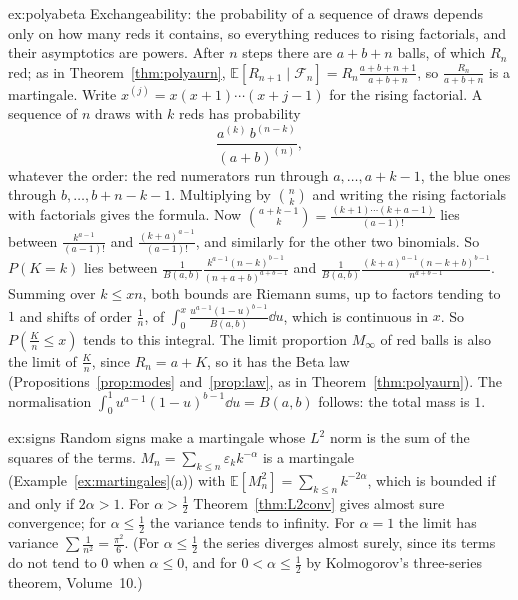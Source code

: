 \begin{solution}{ex:polyabeta}
\idea Exchangeability: the probability of a sequence of draws depends only on how many reds it contains, so everything
reduces to rising factorials, and their asymptotics are powers.
\writeup After $n$ steps there are $a+b+n$ balls, of which $R_n$ red; as in Theorem~\ref{thm:polyaurn}, $\mathbb E[R_{n+1}\mid\mathcal F_n]=R_n\frac{a+b+n+1}{a+b+n}$, so $\frac{R_n}{a+b+n}$ is a
martingale. Write $x^{(j)}=x(x+1)\cdots(x+j-1)$ for the rising factorial. A sequence of $n$ draws with $k$ reds has probability
\[
\frac{a^{(k)}\,b^{(n-k)}}{(a+b)^{(n)}},
\]
whatever the order: the red numerators run through $a,\dots,a+k-1$, the blue ones through $b,\dots,b+n-k-1$. Multiplying by $\binom nk$ and writing
the rising factorials with factorials gives the formula. Now $\binom{a+k-1}k=\frac{(k+1)\cdots(k+a-1)}{(a-1)!}$ lies between $\frac{k^{a-1}}{(a-1)!}$ and $\frac{(k+a)^{a-1}}{(a-1)!}$, and similarly for
the other two binomials. So $P(K=k)$ lies between $\frac1{B(a,b)}\frac{k^{a-1}(n-k)^{b-1}}{(n+a+b)^{a+b-1}}$ and $\frac1{B(a,b)}\frac{(k+a)^{a-1}(n-k+b)^{b-1}}{n^{a+b-1}}$. Summing over $k\le xn$, both
bounds are Riemann sums, up to factors tending to $1$ and shifts of order $\frac1n$, of $\int_0^x\frac{u^{a-1}(1-u)^{b-1}}{B(a,b)}\dd u$, which is continuous in $x$. So $P(\frac Kn\le x)$
tends to this integral. The limit proportion $M_\infty$ of red balls is also the limit of $\frac Kn$, since $R_n=a+K$, so it has the Beta law
(Propositions~\ref{prop:modes} and~\ref{prop:law}, as in Theorem~\ref{thm:polyaurn}). The normalisation $\int_0^1u^{a-1}(1-u)^{b-1}\dd u=B(a,b)$ follows: the total mass is $1$.
\end{solution}

\begin{solution}{ex:signs}
\idea Random signs make a martingale whose $L^2$ norm is the sum of the squares of the terms.
\writeup $M_n=\sum_{k\le n}\varepsilon_kk^{-\alpha}$ is a martingale (Example~\ref{ex:martingales}(a)) with $\mathbb E[M_n^2]=\sum_{k\le n}k^{-2\alpha}$, which is bounded if and only if $2\alpha>1$. For $\alpha>\frac12$
Theorem~\ref{thm:L2conv} gives almost sure convergence; for $\alpha\le\frac12$ the variance tends to infinity. For $\alpha=1$ the limit has variance $\sum\frac1{n^2}=\frac{\pi^2}6$. (For
$\alpha\le\frac12$ the series diverges almost surely, since its terms do not tend to $0$ when $\alpha\le0$, and for $0<\alpha\le\frac12$ by Kolmogorov's three-series
theorem, Volume~10.)
\end{solution}

